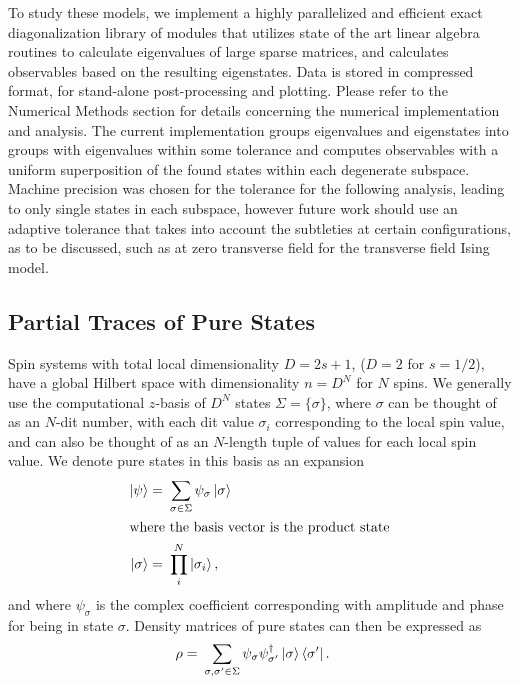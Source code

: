 \documentclass[12pt]{article}{}
\begin{document}
To study these models, we implement a highly parallelized and efficient exact diagonalization library of modules that utilizes state of the art linear algebra routines to calculate eigenvalues of large sparse matrices, and calculates observables based on the resulting eigenstates. Data is stored in compressed format, for stand-alone post-processing and plotting. Please refer to the Numerical Methods section for details concerning the numerical implementation and analysis. The current implementation groups eigenvalues and eigenstates into groups with eigenvalues within some tolerance and computes observables with a uniform superposition of the found states within each degenerate subspace. Machine precision was chosen for the tolerance for the following analysis, leading to only single states in each subspace, however future work should use an adaptive tolerance that takes into account the subtleties at certain configurations, as to be discussed, such as at zero transverse field for the transverse field Ising model.

\subsection*{\small Partial Traces of Pure States}
Spin systems with total local dimensionality $D = 2s +1$, ($D=2$ for $s = 1/2$), have a global Hilbert space with dimensionality $n = D^N$ for $N$ spins. We generally use the computational $z$-basis of $D^N$ states $\Sigma = \{\sigma\}$, where $\sigma$ can be thought of as an $N$-dit number, with each dit value $\sigma_{i}$ corresponding to the local spin value, and can also be thought of as an $N$-length tuple of values for each local spin value. We denote pure states in this basis as an expansion
\begin{align}
  \ket{\psi} =&~ \sum_{\sigma \in \Sigma} \psi_{\sigma} \ket{\sigma} \\
  \intertext{where the basis vector is the product state}
  \ket{\sigma} =&~ \prod_{i}^{N} \ket{\sigma_{i}},
\end{align}
and where $\psi_{\sigma}$ is the complex coefficient corresponding with amplitude and phase for being in state $\sigma$. Density matrices of pure states can then be expressed as
\begin{align}
  \rho =&~ \sum_{\sigma,\sigma^{\prime} \in \Sigma} \psi_{\sigma}\psi_{\sigma^{\prime}}^{\dagger} \ket{\sigma}\bra{\sigma^{\prime}}.
\end{align}
\end{document}
